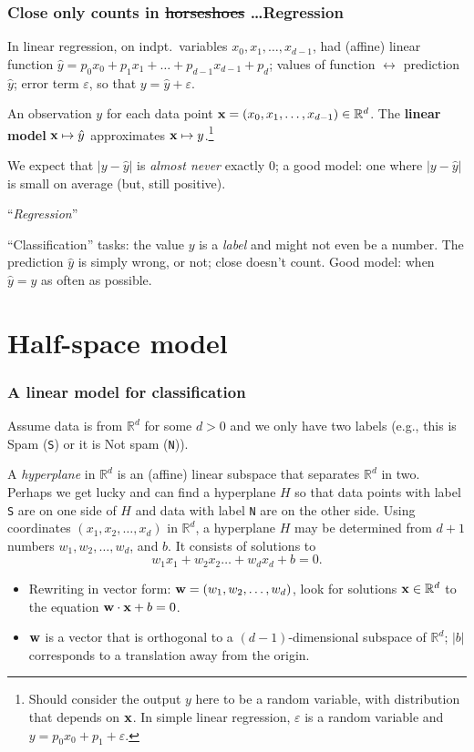 \documentclass{beamer}
\theoremstyle{example}
\begin{document}
\begin{frame}
\frametitle{Close only counts in \sout{horseshoes} \ldots Regression}
In linear regression, on indpt.\ variables $x_0,x_1,\ldots,x_{d-1}$, had (affine) linear function $\hat{y} = p_0x_0+p_1x_{1}+\ldots+p_{d-1}x_{d-1} + p_d$; \newline 
values of function $\leftrightarrow$ prediction $\hat{y}$; error term $\varepsilon$, so that $y = \hat{y} + \varepsilon$.

\pause
An observation $y$ for each data point ${\bf x} = (x_0,x_1,\ldots,x_{d-1}) \in \mathbb R^d$.  The \textbf{linear model} ${\bf x} \mapsto \hat{y}$ approximates ${\bf x} \mapsto y$.\footnote{Should consider the output $y$ here to be a random variable, with distribution that depends on ${\bf x}$. In simple linear regression, $\varepsilon$ is a random variable and $y = p_0x_0 + p_1 + \varepsilon$.} 

\pause
We expect that $|y - \hat{y}|$ is \emph{almost never} exactly 0; a good model: one where $|y - \hat{y}|$ is small on average (but, still positive).
\begin{center}``\emph{Regression}''\end{center}

\pause 
``Classification'' tasks: the value $y$ is a \emph{label} and might not even be a number. The prediction $\hat{y}$ is simply wrong, or not; close doesn't count. Good model: when
$\hat{y} = y$ as often as possible.
\end{frame}

\section{Half-space model}

\begin{frame}
\frametitle{A linear model for classification}
    Assume data is from $\mathbb R^d$ for some $d>0$ and we only have two labels (e.g., this is Spam (\texttt{S}) or it is Not spam (\texttt{N})). 
    \pause

    A \emph{hyperplane} in $\mathbb R^d$ is an (affine) linear subspace that separates $\mathbb R^d$ in two. Perhaps we get lucky and can find a hyperplane $H$ so that data points with label \texttt{S} are on one side of $H$ and data with label \texttt{N} are on the other side.
    \pause
    Using coordinates $(x_1,x_2, \ldots, x_d)$ in $\mathbb R^d$, a hyperplane $H$ may be determined from $d+1$ numbers $w_1,w_2,\ldots,w_d$, and $b$. It consists of solutions to 
        \[w_1x_1 + w_2x_2\ldots + w_dx_d + b = 0.\]

    \begin{itemize}
        \item Rewriting in vector form: ${\bf w}=(w_1,w_2,\ldots,w_d)$, look for solutions ${\bf x}\in\mathbb R^d$ to the equation ${\bf w}\cdot{\bf x} + b = 0$.
        \item ${\bf w}$ is a vector that is orthogonal to a $(d-1)$-dimensional subspace of $\mathbb R^d$; $|b|$ corresponds to a translation away from the origin.
    \end{itemize}

\end{frame}
\end{document}
